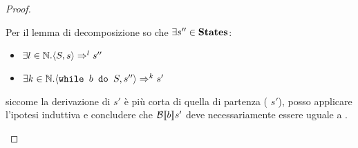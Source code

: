{\begin{proof}
\begin{itemize}
   Per il lemma di decomposizione so che $\exists s''\in\mbox{\textbf{States}}$:
   \begin{itemize}
   \item $\exists l\in\mathbb{N}. \langle{}S, s\rangle{} \Rightarrow^{l} s''$
   \item $\exists k\in\mathbb{N}. \langle{}\mbox{\normalfont{\texttt{while }}} b \textrm{\normalfont{\texttt{ do }}} S, s''\rangle{} \Rightarrow^{k} s'$
   \end{itemize}
   siccome la derivazione di   $s'$ è più
   corta di quella di partenza ( 
   $s'$), posso applicare l'ipotesi induttiva e concludere che $\mathcal{B} \llbracket b \rrbracket s'$ deve
   necessariamente essere uguale a \semfalse.

  \end{itemize} 
 \end{proof}
}
